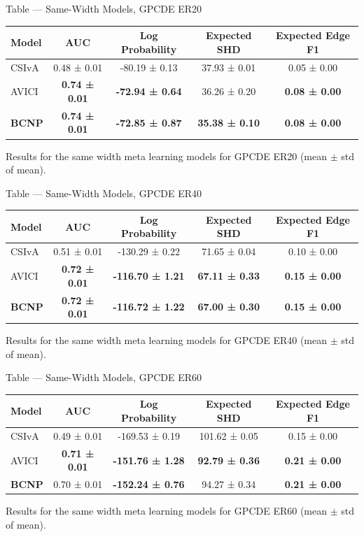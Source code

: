 \documentclass[aspectratio=169,10pt]{beamer}
\begin{document}
\begin{frame}{Table --- Same-Width Models, GPCDE ER20}
\centering
\begin{tabular}{lcccc}
\toprule
\textbf{Model} & \textbf{AUC} & \textbf{Log Probability} & \textbf{Expected SHD} & \textbf{Expected Edge F1} \\
\midrule
CSIvA & 0.48 ± 0.01 & -80.19 ± 0.13 & 37.93 ± 0.01 & 0.05 ± 0.00 \\
AVICI & \textbf{0.74 ± 0.01} & \textbf{-72.94 ± 0.64} & 36.26 ± 0.20 & \textbf{0.08 ± 0.00} \\
\textbf{BCNP} & \textbf{0.74 ± 0.01} & \textbf{-72.85 ± 0.87} & \textbf{35.38 ± 0.10} & \textbf{0.08 ± 0.00} \\
\bottomrule
\end{tabular}

\vspace{0.3cm}
{\footnotesize Results for the same width meta learning models for GPCDE ER20 (mean $\pm$ std of mean).}
\end{frame}

\begin{frame}{Table --- Same-Width Models, GPCDE ER40}
\centering
\begin{tabular}{lcccc}
\toprule
\textbf{Model} & \textbf{AUC} & \textbf{Log Probability} & \textbf{Expected SHD} & \textbf{Expected Edge F1} \\
\midrule
CSIvA & 0.51 ± 0.01 & -130.29 ± 0.22 & 71.65 ± 0.04 & 0.10 ± 0.00 \\
AVICI & \textbf{0.72 ± 0.01} & \textbf{-116.70 ± 1.21} & \textbf{67.11 ± 0.33} & \textbf{0.15 ± 0.00} \\
\textbf{BCNP} & \textbf{0.72 ± 0.01} & \textbf{-116.72 ± 1.22} & \textbf{67.00 ± 0.30} & \textbf{0.15 ± 0.00} \\
\bottomrule
\end{tabular}

\vspace{0.3cm}
{\footnotesize Results for the same width meta learning models for GPCDE ER40 (mean $\pm$ std of mean).}
\end{frame}

\begin{frame}{Table --- Same-Width Models, GPCDE ER60}
\centering
\begin{tabular}{lcccc}
\toprule
\textbf{Model} & \textbf{AUC} & \textbf{Log Probability} & \textbf{Expected SHD} & \textbf{Expected Edge F1} \\
\midrule
CSIvA & 0.49 ± 0.01 & -169.53 ± 0.19 & 101.62 ± 0.05 & 0.15 ± 0.00 \\
AVICI & \textbf{0.71 ± 0.01} & \textbf{-151.76 ± 1.28} & \textbf{92.79 ± 0.36} & \textbf{0.21 ± 0.00} \\
\textbf{BCNP} & 0.70 ± 0.01 & \textbf{-152.24 ± 0.76} & 94.27 ± 0.34 & \textbf{0.21 ± 0.00} \\
\bottomrule
\end{tabular}

\vspace{0.3cm}
{\footnotesize Results for the same width meta learning models for GPCDE ER60 (mean $\pm$ std of mean).}
\end{frame}
\end{document}
